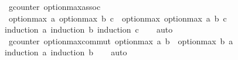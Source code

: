 \begin{isabellebody}
\isamarkupfalse%
\ {\isacharparenleft}\ gcounter{\isacharparenright}\ option{\isacharunderscore}max{\isacharunderscore}assoc{\isacharcolon}\isanewline
\ \ {\isachardoublequoteopen}option{\isacharunderscore}max\ a\ {\isacharparenleft}option{\isacharunderscore}max\ b\ c{\isacharparenright}\ {\isacharequal}\ option{\isacharunderscore}max\ {\isacharparenleft}option{\isacharunderscore}max\ a\ b{\isacharparenright}\ c{\isachardoublequoteclose}\isanewline
%
\isadelimproof
\ \ %
\endisadelimproof
%
\isatagproof
{}\isamarkupfalse%
\ {\isacharparenleft}induction\ a{\isacharsemicolon}\ induction\ b{\isacharsemicolon}\ induction\ c{\isacharparenright}\isanewline
\ \ \isamarkupfalse%
\ {\isacharparenleft}auto{\isacharparenright}\isanewline
\ \ \isamarkupfalse%
%
\endisatagproof
{\isafoldproof}%
%
\isadelimproof
\isanewline
%
\endisadelimproof
\isanewline
{}\isamarkupfalse%
\ {\isacharparenleft}\ gcounter{\isacharparenright}\ option{\isacharunderscore}max{\isacharunderscore}commut{\isacharcolon}\ {\isachardoublequoteopen}option{\isacharunderscore}max\ a\ b\ {\isacharequal}\ option{\isacharunderscore}max\ b\ a{\isachardoublequoteclose}\isanewline
%
\isadelimproof
\ \ %
\endisadelimproof
%
\isatagproof
{}\isamarkupfalse%
\ {\isacharparenleft}induction\ a{\isacharsemicolon}\ induction\ b{\isacharparenright}\isanewline
\ \ \isamarkupfalse%
\ {\isacharparenleft}auto{\isacharparenright}\isanewline
\ \ \isamarkupfalse%
%
\endisatagproof
\end{isabellebody}
